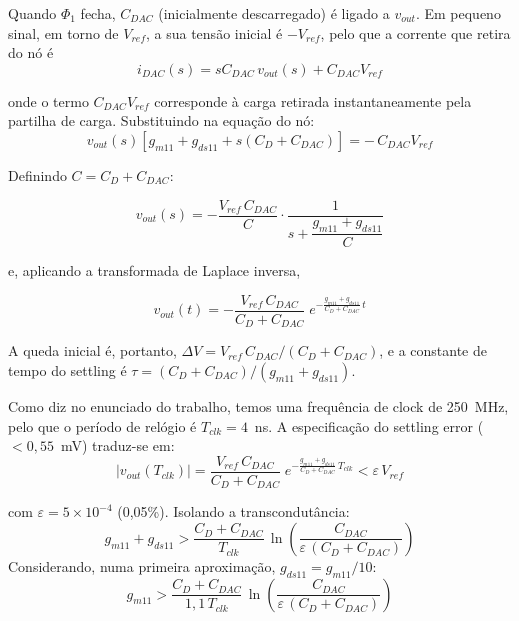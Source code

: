 Quando $\Phi_1$ fecha, $C_{DAC}$ (inicialmente descarregado) é ligado a $v_{out}$. Em pequeno sinal,
em torno de $V_{ref}$, a sua tensão inicial é $-V_{ref}$, pelo que a corrente que retira do nó é
\begin{equation}
    i_{DAC}(s) = sC_{DAC}\,v_{out}(s) + C_{DAC}V_{ref}
\end{equation}

onde o termo $C_{DAC}V_{ref}$ corresponde à carga retirada instantaneamente pela partilha de carga.
Substituindo na equação do nó:
\begin{equation}
    v_{out}(s)\left[g_{m11} + g_{ds11} + s\left(C_D + C_{DAC}\right)\right] = -\,C_{DAC}V_{ref}
\end{equation}

Definindo $C = C_D + C_{DAC}$:

\begin{equation}
    v_{out}(s) = -\frac{V_{ref}\,C_{DAC}}{C}\cdot\frac{1}{s + \dfrac{g_{m11}+g_{ds11}}{C}}
\end{equation}

e, aplicando a transformada de Laplace inversa,

\begin{equation}
    v_{out}(t) = -\frac{V_{ref}\,C_{DAC}}{C_D + C_{DAC}}\;e^{-\frac{g_{m11}+g_{ds11}}{C_D + C_{DAC}}\,t}
    \label{eq:vout_t}
\end{equation}

A queda inicial é, portanto, $\Delta V = V_{ref}\,C_{DAC}/(C_D + C_{DAC})$, e a constante de tempo do settling é
$\tau = (C_D + C_{DAC})/(g_{m11}+g_{ds11})$.

Como diz no enunciado do trabalho, temos uma frequência de clock de 250~MHz, pelo que o período de relógio é $T_{clk} = 4$~ns.
A especificação do settling error ($< 0{,}55$~mV) traduz-se em:
\begin{equation}
    \left|v_{out}(T_{clk})\right| = \frac{V_{ref}\,C_{DAC}}{C_D + C_{DAC}}\;e^{-\frac{g_{m11}+g_{ds11}}{C_D + C_{DAC}}\,T_{clk}} < \varepsilon\,V_{ref}
    \label{eq:cond_erro}
\end{equation}

com $\varepsilon = 5\times10^{-4}$ (0,05\%). Isolando a transcondutância:
\begin{equation}
    g_{m11} + g_{ds11} > \frac{C_D + C_{DAC}}{T_{clk}}\,\ln\!\left(\frac{C_{DAC}}{\varepsilon\,\left(C_D + C_{DAC}\right)}\right)
\end{equation}
Considerando, numa primeira aproximação, $g_{ds11} = g_{m11}/10$:
\begin{equation}
    g_{m11} > \frac{C_D + C_{DAC}}{1{,}1\,T_{clk}}\,\ln\!\left(\frac{C_{DAC}}{\varepsilon\,\left(C_D + C_{DAC}\right)}\right)
    \label{eq:gm_min}
\end{equation}

